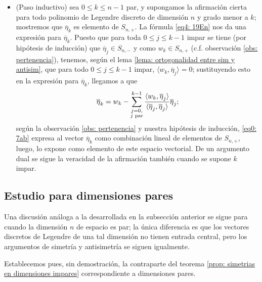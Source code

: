 \begin{itemize}
\item (Paso inductivo) sea $0 \leq k \leq n-1$ par, y
supongamos la afirmación cierta para todo polinomio de Legendre
discreto de dimensión $n$ y grado menor a $k$;
mostremos que $\overline{\eta}_{k}$ es elemento de $S_{n,+}$.
La fórmula \eqref{eq4: 19En} nos da una expresión
para $\overline{\eta}_{k}$.
Puesto que
para toda $0 \leq j \leq k-1$ impar se tiene 
(por hipótesis de inducción) 
que $\overline{\eta}_{j} \in S_{n,-}$
y como $w_{k} \in S_{n,+}$ (c.f. observación 
\ref{obs: pertenencia}), tenemos, según el lema
\ref{lema: ortogonalidad entre sim y antisim}, que
para todo $0 \leq j \leq k-1$ impar, 
$\langle w_{k}, \overline{\eta}_{j} \rangle=0$;
sustituyendo esto en la expresión para 
$\overline{\eta}_{k}$, llegamos a que
\begin{equation}
\label{eq0: 7ab}
\overline{\eta}_{k}= w_{k}-
\sum\limits_{
\substack{ {j=0}, \\  {j\text{ par}}}
}^{k-1}
\frac{\langle w_{k}, \overline{\eta}_{j} \rangle}
{\langle \overline{\eta}_{j}, \overline{\eta}_{j} \rangle}\overline{\eta}_{j}
;
\end{equation}
según la observación \ref{obs: pertenencia}
y nuestra hipótesis de inducción, 
\eqref{eq0: 7ab} expresa al vector 
$\overline{\eta}_{k}$ como combinación lineal
de elementos de $S_{n,+}$, luego, lo expone como
elemento de este espacio vectorial. De un argumento
dual se sigue la veracidad de la afirmación también
cuando se supone $k$ impar.
\end{itemize}
\QEDB
\vspace{0.2cm}

\subsection{Estudio para dimensiones pares}
Una discusión análoga a la desarrollada en la subsección
anterior se sigue para cuando la dimensión $n$ de espacio
es par; la única diferencia es que los vectores discretos
de Legendre de una tal dimensión no tienen entrada central,
pero los argumentos de simetría y antisimetría se siguen
igualmente.

Establecemos pues, sin demostración, 
la contraparte del teorema
\ref{prop: simetrias en dimensiones impares} 
correspondiente a dimensiones pares.


